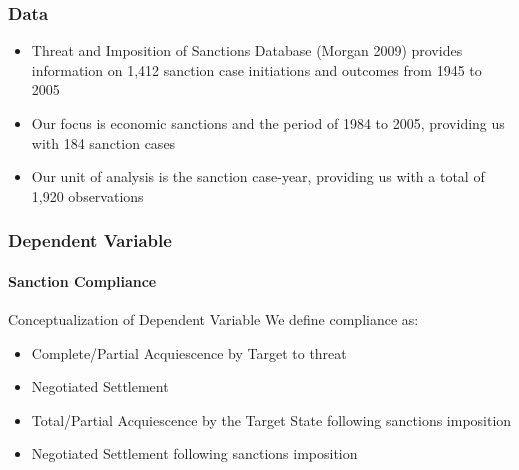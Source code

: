\begin{frame}
\frametitle{Data}

\begin{itemize}
	\item Threat and Imposition of Sanctions Database (Morgan 2009) provides information on 1,412 sanction case initiations and outcomes from 1945 to 2005 
		\vspace{0.1cm}
	\item Our focus is economic sanctions and the period of 1984 to 2005, providing us with 184 sanction cases \\
		\vspace{0.1cm}
	\item Our unit of analysis is the sanction case-year, providing us with a total of 1,920 observations
\end{itemize}

\end{frame}


\begin{frame}
\frametitle{Dependent Variable}
\framesubtitle{Sanction Compliance}

\begin{block}{Conceptualization of Dependent Variable}
	We define compliance as:
	\begin{itemize}
		\item Complete/Partial Acquiescence by Target to threat
		\item Negotiated Settlement
		\item Total/Partial Acquiescence by the Target State following sanctions imposition
		\item Negotiated Settlement following sanctions imposition
	\end{itemize}
\end{block}

\end{frame}

